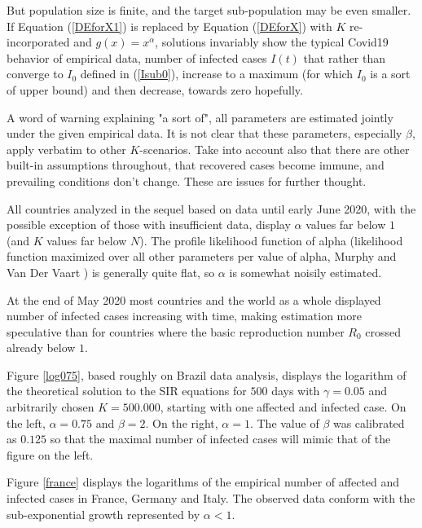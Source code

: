 \documentclass{article}
\begin{document}
\bigskip

But population size is finite, and the target sub-population may be even smaller. If Equation (\ref{DEforX1}) is replaced by Equation (\ref{DEforX}) with $K$ re-incorporated and $g(x)=x^\alpha$, solutions invariably show the typical Covid19 behavior of empirical data, number of infected cases $I(t)$ that rather than converge to $I_0$ defined in (\ref{Isub0}), increase to a maximum (for which $I_0$ is a sort of upper bound) and then decrease, towards zero hopefully.

A word of warning explaining "a sort of", all parameters are estimated jointly under the given empirical data. It is not clear that these parameters, especially $\beta$, apply verbatim to other \linebreak $K$-scenarios. Take into account also that there are other built-in assumptions throughout, that recovered cases become immune, and prevailing conditions don't change. These are issues for further thought.

All countries analyzed in the sequel based on data until early June 2020, with the possible exception of those with insufficient data, display $\alpha$ values far below $1$ (and $K$ values far below $N$). The profile likelihood function of alpha (likelihood function maximized over all other parameters per value of alpha, Murphy and Van Der Vaart \cite{Murphy}) is generally quite flat, so $\alpha$ is somewhat noisily estimated.

At the end of May 2020 most countries and the world as a whole displayed number of infected cases increasing with time, making estimation more speculative than for countries where the basic reproduction number $R_0$ crossed already below $1$.

\bigskip

Figure \ref{log075}, based roughly on Brazil data analysis, displays the logarithm of the theoretical solution to the SIR equations for $500$ days with $\gamma=0.05$ and arbitrarily chosen $K=500.000$, starting with one affected and infected case. On the left, $\alpha=0.75$ and $\beta=2$. On the right, $\alpha=1$. The value of $\beta$ was calibrated as $0.125$ so that the maximal number of infected cases will mimic that of the figure on the left.

Figure \ref{france} displays the logarithms of the empirical number of affected and infected cases in France, Germany and Italy. The observed data conform with the sub-exponential growth represented by $\alpha<1$.
\end{document}
